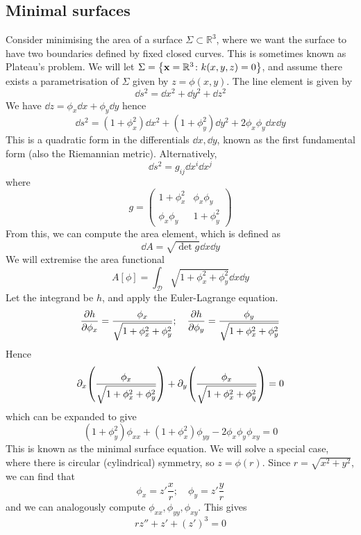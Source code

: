 \subsection{Minimal surfaces}
Consider minimising the area of a surface \( \Sigma \subset \mathbb R^3 \), where we want the surface to have two boundaries defined by fixed closed curves.
This is sometimes known as Plateau's problem.
We will let \( \Sigma = \qty{ \vb x = \mathbb R^3 \colon k(x, y, z) = 0 } \), and assume there exists a parametrisation of \( \Sigma \) given by \( z = \phi(x, y) \).
The line element is given by
\[
	\dd{s}^2 = \dd{x}^2 + \dd{y}^2 + \dd{z}^2
\]
We have \( \dd{z} = \phi_x \dd{x} + \phi_y \dd{y} \) hence
\[
	\dd{s}^2 = ( 1 + \phi_x^2 ) \dd{x}^2 + ( 1 + \phi_y^2 ) \dd{y}^2 + 2 \phi_x \phi_y \dd{x}\dd{y}
\]
This is a quadratic form in the differentials \( \dd{x}, \dd{y} \), known as the first fundamental form (also the Riemannian metric).
Alternatively,
\[
	\dd{s}^2 = g_{ij}\dd{x^i}\dd{x^j}
\]
where
\[
	g = \begin{pmatrix}
		1 + \phi_x^2  & \phi_x \phi_y \\
		\phi_x \phi_y & 1 + \phi_y^2
	\end{pmatrix}
\]
From this, we can compute the area element, which is defined as
\[
	\dd{A} = \sqrt{\det g} \dd{x}\dd{y}
\]
We will extremise the area functional
\[
	A[\phi] = \int_{\mathcal D} \sqrt{1 + \phi_x^2 + \phi_y^2}\dd{x}\dd{y}
\]
Let the integrand be \( h \), and apply the Euler-Lagrange equation.
\[
	\pdv{h}{\phi_x} = \frac{\phi_x}{\sqrt{1 + \phi_x^2 + \phi_y^2}};\quad \pdv{h}{\phi_y} = \frac{\phi_y}{\sqrt{1 + \phi_x^2 + \phi_y^2}}
\]
Hence
\[
	\partial_x \qty(\frac{\phi_x}{\sqrt{1 + \phi_x^2 + \phi_y^2}}) + \partial_y \qty(\frac{\phi_x}{\sqrt{1 + \phi_x^2 + \phi_y^2}}) = 0
\]
which can be expanded to give
\[
	(1 + \phi_y^2)\phi_{xx} + (1 + \phi_x^2)\phi_{yy} - 2 \phi_x \phi_y \phi_{xy} = 0
\]
This is known as the minimal surface equation.
We will solve a special case, where there is circular (cylindrical) symmetry, so \( z = \phi(r) \).
Since \( r = \sqrt{x^2 + y^2} \), we can find that
\[
	\phi_x = z' \frac{x}{r};\quad \phi_y = z' \frac{y}{r}
\]
and we can analogously compute \( \phi_{xx}, \phi_{yy}, \phi_{xy} \).
This gives
\[
	rz'' + z' + (z')^3 = 0
\]

